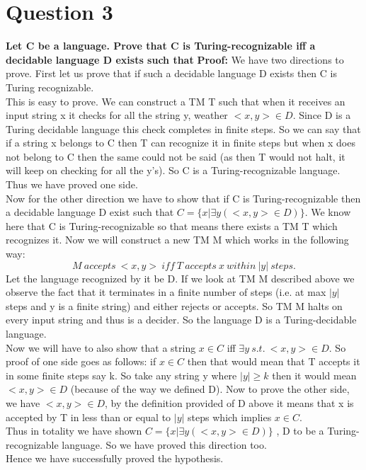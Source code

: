 \documentclass{article}
\begin{document}
\pagebreak


\section{Question 3}
\textbf{Let C be a language.  Prove that C is Turing-recognizable iff a decidable language D exists such that }
\textbf{Proof:} We have two directions to prove. First let us prove that if such a decidable language D exists  then C is Turing recognizable.\\
This is easy to prove. We can construct a TM T such that when it receives an input string x it checks for all the string y, weather $<x,y> \in D$. Since D is a Turing decidable language this check completes in finite steps. So we can say that if a string x belongs to C then T can recognize it in finite steps but when x does not belong to C then the same could not be said (as then T would not halt, it will keep on checking for all the y's). So C is a Turing-recognizable language. Thus we have proved one side.\\
Now for the other direction we have to show that if C is Turing-recognizable then a decidable language D exist such that $C=\{ x| \exists y( <x, y> \in D)\}$. We know here that C is Turing-recognizable so that means there exists a TM T which recognizes it. Now we will construct a new TM M which works in the following way:\\
$$M \ accepts \ <x,y> \ iff \ T \ accepts \ x \ within \ |y| \ steps.$$
Let the language recognized by it be D. If we look at TM M described above we  observe the fact that it terminates in a finite number of steps (i.e. at max $|y|$ steps and y is a finite string) and either rejects or accepts. So TM M halts on every input string and thus is a decider. So the language D is a Turing-decidable language. \\
Now we will have to also show that a string $x \in C$ iff  $ \exists y \ s.t. \ <x,y> \in D$. So proof of one side goes as follows: if $x \in C$ then that would mean that T accepts it in some finite steps say k. So take any string y where $|y| \geq k$ then it would mean $<x,y> \in D$ (because of the way we defined D). Now to prove the other side, we have $<x,y> \in D$, by the definition provided of D above it means that x is accepted by T in less than or equal to $|y|$ steps which implies $x \in C$. \\
Thus in totality we have shown $C=\{ x| \exists y( <x, y> \in D)\}$ , D to be a Turing-recognizable language. So we have proved this direction too. \\
Hence we have successfully proved the hypothesis. 
\end{document}
